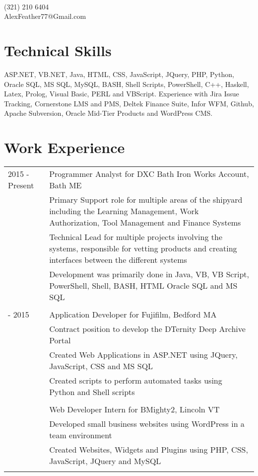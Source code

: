 \documentclass[12pt]{article}
\begin{document}
\pagestyle{empty}
\selectfont

{\\
\vspace{0.1cm}(321) 210 6404\\\vspace{0.1cm}AlexFeather77@Gmail.com\\}
\vspace{0.4cm}

\section*{\selectfont Technical Skills}
ASP.NET, VB.NET, Java, HTML, CSS, JavaScript, JQuery, PHP, Python, Oracle SQL, MS SQL, MySQL, BASH, Shell Scripts, PowerShell, C++, Haskell, Latex, Prolog, Visual Basic, PERL and VBScript. Experience with Jira Issue Tracking, Cornerstone LMS and PMS, Deltek Finance Suite, Infor WFM, Github, Apache Subversion, Oracle Mid-Tier Products and WordPress CMS.

\section*{\selectfont Work Experience}
\begin{tabular}{p{2.7cm}|p{15.0cm}}
	2015 - Present & Programmer Analyst for DXC Bath Iron Works Account, Bath ME\\&\small{Primary Support role for multiple areas of the shipyard including the Learning Management, Work Authorization, Tool Management and Finance Systems}\\&\small{Technical Lead for multiple projects involving the systems, responsible for vetting products and creating interfaces between the different systems}\\&\small{Development was primarily done in Java, VB, VB Script, PowerShell, Shell, BASH, HTML Oracle SQL and MS SQL}
	\\\multicolumn{2}{c}{} \\
	\centering 2014 - 2015 & Application Developer for Fujifilm, Bedford MA\\&\small{Contract position to develop the DTernity Deep Archive Portal}\\&\small{Created Web Applications in ASP.NET using JQuery, JavaScript, CSS and MS SQL}\\&\small{Created scripts to perform automated tasks using Python and Shell scripts}
	\\\multicolumn{2}{c}{} \\
	\centering 2013 & Web Developer Intern for BMighty2, Lincoln VT\\&\small{Developed small business websites using WordPress in a team environment}\\&\small{Created Websites, Widgets and Plugins using PHP, CSS, JavaScript, JQuery and MySQL}\\\multicolumn{2}{c}{} \\
\end{tabular}
\end{document}
